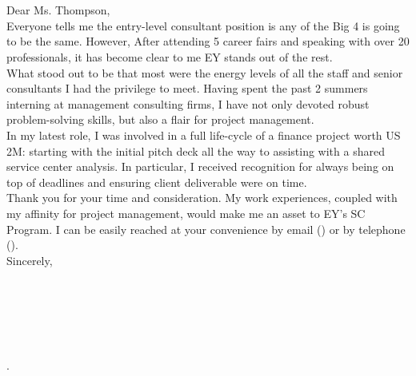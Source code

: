 



\pagestyle{myheadings}
\pagestyle{fancy}
\fancyhf{}

  


\grayitit{\today}\\\\

{}

\vspace{2em}

Dear Ms. Thompson,\\

Everyone tells me the entry-level consultant position is any of the Big 4 is going to be the same. However, After attending 5 career fairs and speaking with over 20 professionals, it has become clear to me EY stands out of the rest.\\

What stood out to be that most were the energy levels of all the staff and senior consultants I had the privilege to meet.
Having spent the past 2 summers interning at management consulting firms, I have not only devoted robust problem-solving skills, but also a flair for project management.\\

In my latest role, I was involved in a full life-cycle of a finance project worth US 2M: starting with the initial pitch deck all the way to assisting with a shared service center analysis. In particular, I received recognition for always being on top of deadlines and ensuring client deliverable were on time.\\

Thank you for your time and consideration. My work experiences, coupled with my affinity for project management, would make me an asset to EY's SC Program. I can be easily reached at your convenience by email (\email) or by telephone (\phone).\\

Sincerely,\\\\\\\\\\\\

\textbf{{\firstname} {\lastname}}


\fancyfoot[L]{\grayit{\today}}

. 
